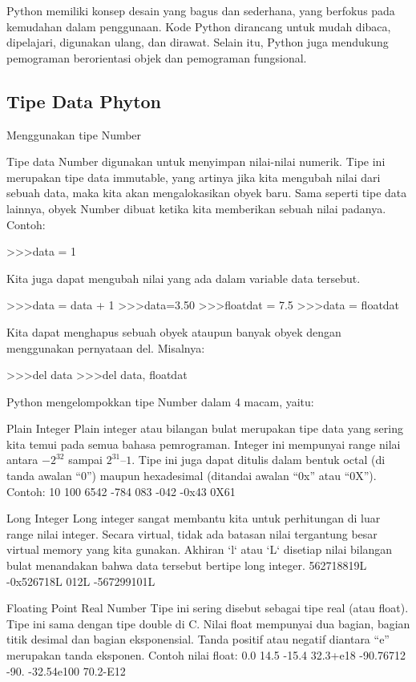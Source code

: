 Python memiliki konsep desain yang bagus dan sederhana, yang berfokus pada kemudahan dalam penggunaan. Kode Python dirancang untuk mudah dibaca, dipelajari, digunakan ulang, dan dirawat. Selain itu, Python juga mendukung pemograman berorientasi objek dan pemograman fungsional.


\subsection{Tipe Data Phyton}
	Menggunakan tipe Number

Tipe data Number digunakan untuk menyimpan nilai-nilai numerik. Tipe ini merupakan tipe data immutable, yang artinya jika kita mengubah nilai dari sebuah data, maka kita akan mengalokasikan obyek baru. Sama seperti tipe data lainnya, obyek Number dibuat ketika kita memberikan sebuah nilai padanya. Contoh:

>>>data = 1

Kita juga dapat mengubah nilai yang ada dalam variable data tersebut.

>>>data = data + 1
>>>data=3.50
>>>floatdat = 7.5
>>>data = floatdat

Kita dapat menghapus sebuah obyek ataupun banyak obyek dengan menggunakan pernyataan del. Misalnya:

>>>del data
>>>del data, floatdat

Python mengelompokkan tipe Number dalam 4 macam, yaitu:

Plain Integer
Plain integer atau bilangan bulat merupakan tipe data yang sering kita temui pada semua bahasa pemrograman. Integer ini mempunyai range nilai antara $-2^32$ sampai $2^31 – 1$. Tipe ini juga dapat ditulis dalam bentuk octal (di tanda awalan “0”) maupun hexadesimal (ditandai awalan “0x” atau “0X”). Contoh:
10 100 6542 -784
083 -042 -0x43 0X61

Long Integer
Long integer sangat membantu kita untuk perhitungan di luar range nilai integer. Secara virtual, tidak ada batasan nilai tergantung besar virtual memory yang kita gunakan. Akhiran ‘l‘ atau ‘L‘ disetiap nilai bilangan bulat menandakan bahwa data tersebut bertipe long integer.
562718819L -0x526718L 012L -567299101L

Floating Point Real Number
Tipe ini sering disebut sebagai tipe real (atau float). Tipe ini sama dengan tipe double di C. Nilai float mempunyai dua bagian, bagian titik desimal dan bagian eksponensial. Tanda positif atau negatif diantara “e” merupakan tanda eksponen. Contoh nilai float:
0.0 14.5 -15.4 32.3+e18
-90.76712 -90. -32.54e100 70.2-E12

